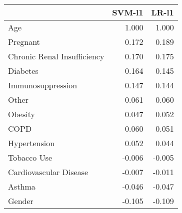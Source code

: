\begin{tabular}{lrr}
\toprule
{} &  SVM-l1 &  LR-l1 \\
\midrule
Age                         &   1.000 &  1.000 \\
Pregnant                    &   0.172 &  0.189 \\
Chronic Renal Insufficiency &   0.170 &  0.175 \\
Diabetes                    &   0.164 &  0.145 \\
Immunosuppression           &   0.147 &  0.144 \\
Other                       &   0.061 &  0.060 \\
Obesity                     &   0.047 &  0.052 \\
COPD                        &   0.060 &  0.051 \\
Hypertension                &   0.052 &  0.044 \\
Tobacco Use                 &  -0.006 & -0.005 \\
Cardiovascular Disease      &  -0.007 & -0.011 \\
Asthma                      &  -0.046 & -0.047 \\
Gender                      &  -0.105 & -0.109 \\
\bottomrule
\end{tabular}
